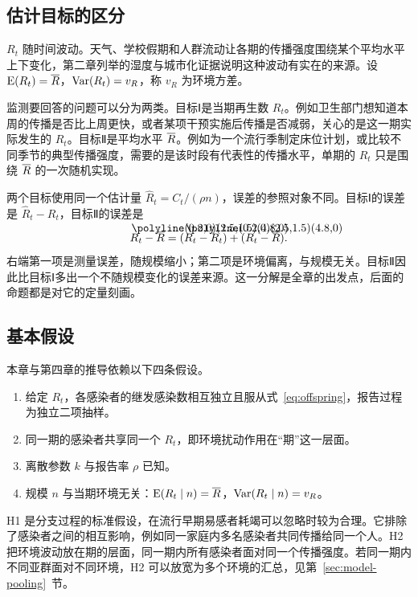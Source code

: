 \subsection{估计目标的区分}

$R_t$ 随时间波动。天气、学校假期和人群流动让各期的传播强度围绕某个平均水平上下变化，第二章列举的湿度与城市化证据\citep{shaman2010absolute, dalziel2018urbanization}说明这种波动有实在的来源。设 $\operatorname{E}(R_t)=\overline{R}$，$\operatorname{Var}(R_t)=v_R$，称 $v_R$ 为环境方差。

监测要回答的问题可以分为两类。目标Ⅰ是当期再生数 $R_t$。例如卫生部门想知道本周的传播是否比上周更快，或者某项干预实施后传播是否减弱，关心的是这一期实际发生的 $R_t$。目标Ⅱ是平均水平 $\overline{R}$。例如为一个流行季制定床位计划，或比较不同季节的典型传播强度，需要的是该时段有代表性的传播水平，单期的 $R_t$ 只是围绕 $\overline{R}$ 的一次随机实现。

两个目标使用同一个估计量 $\widehat R_t=C_t/(\rho n)$，误差的参照对象不同。目标Ⅰ的误差是 $\widehat R_t-R_t$，目标Ⅱ的误差是
\begin{equation}
  \widehat R_t-\Rbar=(\widehat R_t-R_t)+(R_t-\Rbar).
  \label{eq:error-split}
\end{equation}
右端第一项是测量误差，随规模缩小；第二项是环境偏离，与规模无关。目标Ⅱ因此比目标Ⅰ多出一个不随规模变化的误差来源。这一分解是全章的出发点，后面的命题都是对它的定量刻画。

\subsection{基本假设}

本章与第四章的推导依赖以下四条假设。

\begin{enumerate}[label=H\arabic*]
  \item 给定 $R_t$，各感染者的继发感染数相互独立且服从式~\eqref{eq:offspring}，报告过程为独立二项抽样。
  \item 同一期的感染者共享同一个 $R_t$，即环境扰动作用在“期”这一层面。
  \item 离散参数 $k$ 与报告率 $\rho$ 已知。
  \item 规模 $n$ 与当期环境无关：$\operatorname{E}(R_t\mid n)=\overline{R}$，$\operatorname{Var}(R_t\mid n)=v_R$。
\end{enumerate}

H1 是分支过程的标准假设，在流行早期易感者耗竭可以忽略时较为合理。它排除了感染者之间的相互影响，例如同一家庭内多名感染者共同传播给同一个人。H2 把环境波动放在期的层面，同一期内所有感染者面对同一个传播强度。若同一期内不同亚群面对不同环境，H2 可以放宽为多个环境的汇总，见第~\ref{sec:model-pooling}~节。

